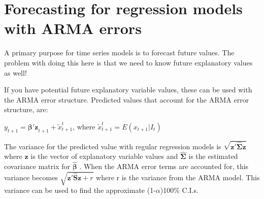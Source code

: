 \documentclass[
]{book}
\theoremstyle{definition}
\theoremstyle{definition}
\theoremstyle{definition}
\theoremstyle{definition}
\theoremstyle{remark}
\begin{document}
\hypertarget{forecasting-for-regression-models-with-arma-errors}{%
\section{Forecasting for regression models with ARMA errors}\label{forecasting-for-regression-models-with-arma-errors}}

A primary purpose for time series models is to forecast future values. The problem with doing this here is that we need to know future explanatory values as well!

If you have potential future explanatory variable values, these can be used with the ARMA error structure. Predicted values that account for the ARMA error structure, are:

\(y_{t+1}=\boldsymbol{\beta'z}_{t+1}+\tilde x^t_{t+1}\), where \(\tilde x^t_{t+1}=E(x_{t+1}| I_t)\)

The variance for the predicted value with regular regression models is \(\sqrt{\boldsymbol{z'\hat \Sigma z}}\) where \(\boldsymbol z\) is the vector of explanatory variable values and \(\boldsymbol{\hat \Sigma}\) is the estimated covariance matrix for \(\boldsymbol{\hat \beta}\) . When the ARMA error terms are accounted for, this variance becomes \(\sqrt{\boldsymbol{z'\hat S z}+r}\) where r is the variance from the ARMA model. This variance can be used to find the approximate (1-\(\alpha\))100\% C.I.s.
\end{document}
